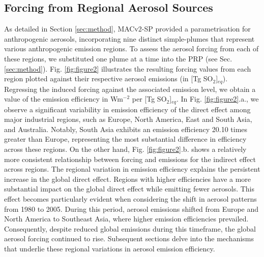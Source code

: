 \documentclass[draft]{agujournal2019}
\begin{document}
      \subsection{Forcing from Regional Aerosol Sources}
            As detailed in Section \ref{sec:method}, MACv2-SP provided a parametrisation for anthropogenic aerosols, incorporating nine distinct simple-plumes that represent various anthropogenic emission regions. To assess the aerosol forcing from each of these regions, we substituted one plume at a time into the PRP (see Sec. \ref{sec:method}). Fig. \ref{fig:figure2} illustrates the resulting forcing values from each region plotted against their respective aerosol emissions (in [Tg SO$_2$]$_{eq}$). Regressing the induced forcing against the associated emission level, we obtain a value of the emission efficiency in Wm$^{-2}$ per [Tg SO$_2$]$_{eq}$.
            In Fig. \ref{fig:figure2}.a., we observe a significant variability in emission efficiency of the direct effect among major industrial regions, such as Europe, North America, East and South Asia, and Australia. Notably, South Asia exhibits an emission efficiency 20.10 times greater than Europe, representing the most substantial difference in efficiency across these regions. On the other hand, Fig. \ref{fig:figure2}.b. shows a relatively more consistent relationship between forcing and emissions for the indirect effect across regions. 
            The regional variation in emission efficiency explains the persistent increase in the global direct effect. Regions with higher efficiencies have a more substantial impact on the global direct effect while emitting fewer aerosols. This effect becomes particularly evident when considering the shift in aerosol patterns from 1980 to 2005. During this period, aerosol emissions shifted from Europe and North America to Southeast Asia, where higher emission efficiencies prevailed. Consequently, despite reduced global emissions during this timeframe, the global aerosol forcing continued to rise.
            Subsequent sections delve into the mechanisms that underlie these regional variations in aerosol emission efficiency.
\end{document}
